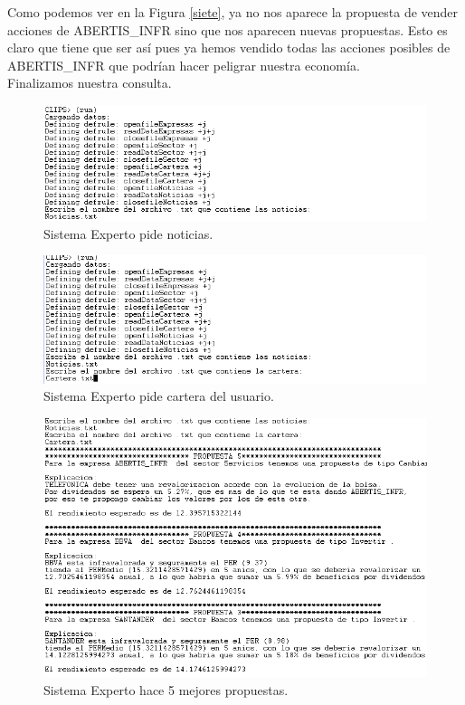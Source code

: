 \documentclass[12pt]{article}
\begin{document}
Como podemos ver en la Figura \ref{siete}, ya no nos aparece la propuesta de vender acciones de ABERTIS\_INFR sino que nos aparecen nuevas propuestas. Esto es claro que tiene que ser así pues ya hemos vendido todas las acciones posibles de ABERTIS\_INFR que podrían hacer peligrar nuestra economía. \\

Finalizamos nuestra consulta.\\



\begin{figure}[H]
	\includegraphics[width=25cm]{1.png} 
	\caption{Sistema Experto pide noticias.}
	\label{uno} 
\end{figure}

\begin{figure}[H]
	\includegraphics[width=25cm]{2.png} 
	\caption{Sistema Experto pide cartera del usuario.}
	\label{dos} 
\end{figure}

\begin{figure}[H]
	\includegraphics[width=15cm]{3.png} 
	\caption{Sistema Experto hace 5 mejores propuestas.}
	\label{tres} 
\end{figure}
\end{document}
